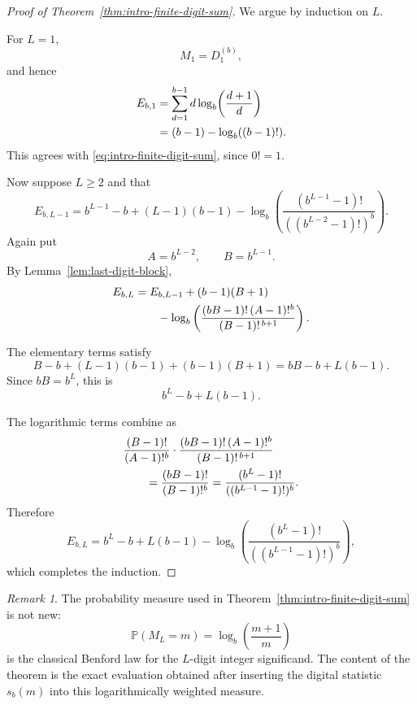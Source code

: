 \documentclass[11pt]{article}
\theoremstyle{definition}
\theoremstyle{remark}
\newtheorem*{remark}{Remark}
\begin{document}
\begin{proof}[Proof of Theorem~\ref{thm:intro-finite-digit-sum}]
We argue by induction on \(L\).

For \(L=1\),
\[
    M_1=D_1^{(b)},
\]
and hence
\begin{align}
    E_{b,1}
    &=
    \sum_{d=1}^{b-1}
    d\log_b\!\left(\frac{d+1}{d}\right)
    \notag\\
    &=
    (b-1)-\log_b((b-1)!).
    \label{eq:E-base-case}
\end{align}
This agrees with
\eqref{eq:intro-finite-digit-sum}, since \(0!=1\).

Now suppose \(L\ge2\) and that
\begin{equation}
    E_{b,L-1}
    =
    b^{L-1}-b+(L-1)(b-1)
    -
    \log_b
    \left(
        \frac{
            (b^{L-1}-1)!
        }{
            ((b^{L-2}-1)!)^b
        }
    \right).
    \label{eq:E-induction-hypothesis}
\end{equation}
Again put
\[
    A=b^{L-2},
    \qquad
    B=b^{L-1}.
\]
By Lemma~\ref{lem:last-digit-block},
\begin{align}
    E_{b,L}
    &=
    E_{b,L-1}
    +
    (b-1)(B+1)
    \notag\\
    &\qquad
    -
    \log_b
    \left(
        \frac{
            (bB-1)!\,(A-1)!^b
        }{
            (B-1)!^{\,b+1}
        }
    \right).
    \label{eq:E-induction-step-start}
\end{align}

The elementary terms satisfy
\[
    B-b+(L-1)(b-1)+(b-1)(B+1)
    =
    bB-b+L(b-1).
\]
Since \(bB=b^L\), this is
\[
    b^L-b+L(b-1).
\]

The logarithmic terms combine as
\begin{align}
    &
    \frac{(B-1)!}{(A-1)!^b}
    \cdot
    \frac{(bB-1)!\,(A-1)!^b}
         {(B-1)!^{\,b+1}}
    \notag\\
    &\qquad=
    \frac{(bB-1)!}{(B-1)!^b}
    =
    \frac{
        (b^L-1)!
    }{
        ((b^{L-1}-1)!)^b
    }.
    \label{eq:E-log-combination}
\end{align}
Therefore
\[
\boxed{
    E_{b,L}
    =
    b^L-b+L(b-1)
    -
    \log_b
    \left(
        \frac{
            (b^L-1)!
        }{
            ((b^{L-1}-1)!)^b
        }
    \right),
}
\]
which completes the induction.
\end{proof}

\begin{remark}
\label{rem:finite-identity-novelty}
The probability measure used in
Theorem~\ref{thm:intro-finite-digit-sum} is not new:
\[
    \mathbb P(M_L=m)
    =
    \log_b\!\left(\frac{m+1}{m}\right)
\]
is the classical Benford law for the \(L\)-digit integer significand.
The content of the theorem is the exact evaluation obtained after
inserting the digital statistic \(s_b(m)\) into this logarithmically
weighted measure.
\end{remark}
\end{document}
